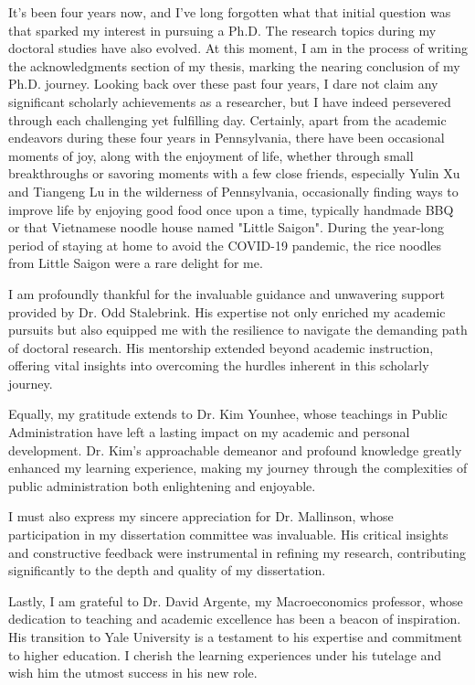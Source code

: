It's been four years now, and I've long forgotten what that initial question was that sparked my interest in pursuing a Ph.D. The research topics during my doctoral studies have also evolved. At this moment, I am in the process of writing the acknowledgments section of my thesis, marking the nearing conclusion of my Ph.D. journey. Looking back over these past four years, I dare not claim any significant scholarly achievements as a researcher, but I have indeed persevered through each challenging yet fulfilling day. Certainly, apart from the academic endeavors during these four years in Pennsylvania, there have been occasional moments of joy, along with the enjoyment of life, whether through small breakthroughs or savoring moments with a few close friends, especially Yulin Xu and Tiangeng Lu in the wilderness of Pennsylvania, occasionally finding ways to improve life by enjoying good food once upon a time, typically handmade BBQ or that Vietnamese noodle house named "Little Saigon". During the year-long period of staying at home to avoid the COVID-19 pandemic, the rice noodles from Little Saigon were a rare delight for me.

I am profoundly thankful for the invaluable guidance and unwavering support provided by Dr. Odd Stalebrink. His expertise not only enriched my academic pursuits but also equipped me with the resilience to navigate the demanding path of doctoral research. His mentorship extended beyond academic instruction, offering vital insights into overcoming the hurdles inherent in this scholarly journey.

Equally, my gratitude extends to Dr. Kim Younhee, whose teachings in Public Administration have left a lasting impact on my academic and personal development. Dr. Kim's approachable demeanor and profound knowledge greatly enhanced my learning experience, making my journey through the complexities of public administration both enlightening and enjoyable.

I must also express my sincere appreciation for Dr. Mallinson, whose participation in my dissertation committee was invaluable. His critical insights and constructive feedback were instrumental in refining my research, contributing significantly to the depth and quality of my dissertation.

Lastly, I am grateful to Dr. David Argente, my Macroeconomics professor, whose dedication to teaching and academic excellence has been a beacon of inspiration. His transition to Yale University is a testament to his expertise and commitment to higher education. I cherish the learning experiences under his tutelage and wish him the utmost success in his new role.

